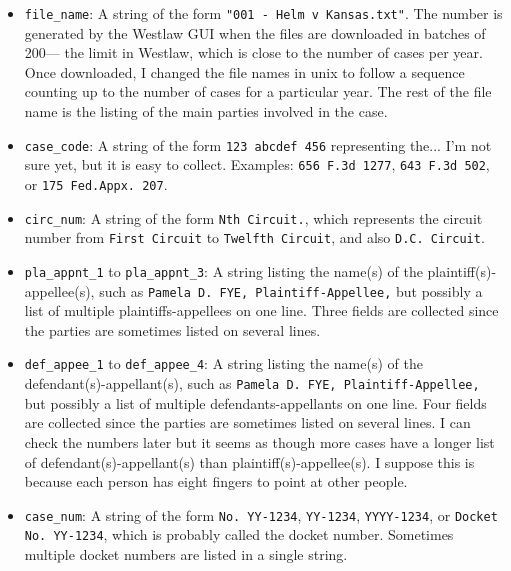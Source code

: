 \documentclass[11pt]{paper}
\begin{document}
\begin{itemize}
	\item \texttt{file\_name}: A string of the form 
		\texttt{"001 - Helm v Kansas.txt"}. 
		The number is generated by the Westlaw GUI 
		when the files are downloaded in batches of 200---%
		the limit in Westlaw, which is close to the number of cases per year. 
		Once downloaded, I changed the file names in unix to follow a sequence 
		counting up to the number of cases for a particular year. 
		The rest of the file name is the listing of the main parties involved 
		in the case. 

	\item \texttt{case\_code}: A string of the form \texttt{123 abcdef 456}
		representing the... I'm not sure yet, but it is easy to collect. 
		Examples: \texttt{656 F.3d 1277}, \texttt{643 F.3d 502}, 
		or \texttt{175 Fed.Appx. 207}.

	\item \texttt{circ\_num}: A string of the form \texttt{Nth Circuit.}, 
		which represents the circuit number 
		from \texttt{First Circuit} to \texttt{Twelfth Circuit}, 
		and also \texttt{D.C. Circuit}. 

	\item \texttt{pla\_appnt\_1} to \texttt{pla\_appnt\_3}: A string listing 
		the name(s) of the plaintiff(s)-appellee(s), 
		such as \texttt{Pamela D. FYE, Plaintiff-Appellee,} 
		but possibly a list of multiple plaintiffs-appellees on one line. 
		Three fields are collected since the parties are sometimes 
		listed on several lines. 

	\item \texttt{def\_appee\_1} to \texttt{def\_appee\_4}: A string listing 
		the name(s) of the defendant(s)-appellant(s), 
		such as \texttt{Pamela D. FYE, Plaintiff-Appellee,} 
		but possibly a list of multiple defendants-appellants
		on one line. 
		Four fields are collected since the parties are sometimes 
		listed on several lines. 
		I can check the numbers later but it seems as though 
		more cases have a longer list of defendant(s)-appellant(s)
		than plaintiff(s)-appellee(s). 
		I suppose this is because each person has eight fingers 
		to point at other people. 

	\item \texttt{case\_num}: A string of the form \texttt{No. YY-1234},  
		\texttt{YY-1234},  \texttt{YYYY-1234}, 
		or  \texttt{Docket No. YY-1234}, 
		which is probably called the docket number. 
		Sometimes multiple docket numbers are listed in a single string.


\end{itemize}
\end{document}
